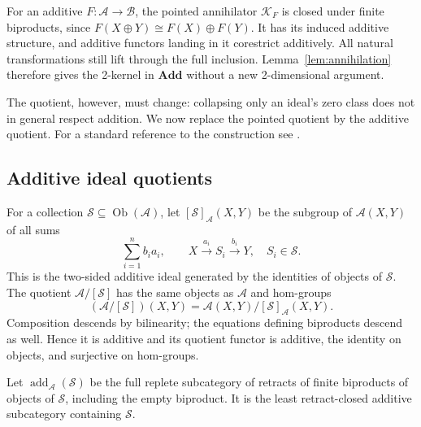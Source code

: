 \documentclass[11pt,reqno,a4paper]{amsart}
\theoremstyle{definition}
\theoremstyle{remark}
\newcommand{\A}{\mathcal{A}}
\newcommand{\0}{\mathbf{0}}
\renewcommand{\1}{\mathbf{1}}
\newcommand{\iso}{\cong}
\newcommand{\Add}{\mathbf{Add}}
\newcommand{\B}{\mathcal B}
\newcommand{\K}{\mathcal K}
\newcommand{\Scl}{\mathcal S}
\newcommand{\aq}[2]{#1/[#2]}
\DeclareMathOperator{\Ob}{Ob}
\DeclareMathOperator{\add}{add}
\begin{document}
For an additive $F:\A\to\B$, the pointed annihilator $\K_F$ is
closed under finite biproducts, since
$F(X\oplus Y)\iso F(X)\oplus F(Y)$. It has its induced additive
structure, and additive functors landing in it corestrict additively.
All natural transformations still lift through the full inclusion.
Lemma~\ref{lem:annihilation} therefore gives the 2-kernel in $\Add$
without a new 2-dimensional argument.

The quotient, however, must change: collapsing only an ideal's zero
class does not in general respect addition. We now replace the pointed
quotient by the additive quotient. For a standard reference to the construction
see \cite[Recollection 2.7]{BalmerDA}.

\subsection{Additive ideal quotients}

For a collection $\Scl\subseteq\Ob(\A)$, let $[\Scl]_{\A}(X,Y)$
be the subgroup of $\A(X,Y)$ of all sums
\begin{equation}\label{eq:addideal}
 \sum_{i=1}^{n} b_i a_i,
 \qquad X\xrightarrow{a_i}S_i\xrightarrow{b_i}Y,
 \quad S_i\in\Scl.
\end{equation}
This is the two-sided additive ideal generated by the identities of
objects of $\Scl$. The quotient $\aq{\A}{\Scl}$ has the same
objects as $\A$ and hom-groups
\begin{equation}\label{eq:addquotient}
 (\aq{\A}{\Scl})(X,Y)=\A(X,Y)/[\Scl]_{\A}(X,Y).
\end{equation}
Composition descends by bilinearity; the equations defining biproducts
descend as well. Hence it is additive and its quotient functor is
additive, the identity on objects, and surjective on hom-groups.

Let $\add_{\A}(\Scl)$ be the full replete subcategory of retracts of
finite biproducts of objects of $\Scl$, including the empty biproduct.
It is the least retract-closed additive subcategory containing $\Scl$.
\end{document}
